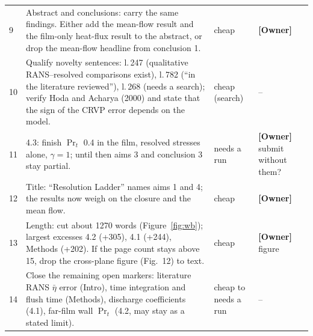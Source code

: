 \documentclass[10pt]{article}
\begin{document}
{\begin{longtable}{@{}L{0.4cm} L{10.6cm} L{2.4cm} L{2.4cm}@{}}
9 & Abstract and conclusions: carry the same findings. Either add the mean-flow result and the film-only
heat-flux result to the abstract, or drop the mean-flow headline from conclusion 1. & cheap & \textbf{[Owner]} \\
10 & Qualify novelty sentences: l.\,247 (qualitative RANS--resolved comparisons exist), l.\,782 (``in the
literature reviewed''), l.\,268 (needs a search); verify Hoda and Acharya (2000) and state that the sign of the
CRVP error depends on the model. & cheap (search) & -- \\
11 & 4.3: finish $\Pr_t$ 0.4 in the film, resolved stresses alone, $\gamma=1$; until then aims 3 and conclusion 3
stay partial. & needs a run & \textbf{[Owner]} submit without them? \\
12 & Title: ``Resolution Ladder'' names aims 1 and 4; the results now weigh on the closure and the mean flow. &
cheap & \textbf{[Owner]} \\
13 & Length: cut about 1270 words (Figure~\ref{fig:wb}); largest excesses 4.2 (+305), 4.1 (+244), Methods (+202).
If the page count stays above 15, drop the cross-plane figure (Fig.~12) to text. & cheap &
\textbf{[Owner]} figure \\
14 & Close the remaining open markers: literature RANS $\bar\eta$ error (Intro), time integration and flush time
(Methods), discharge coefficients (4.1), far-film wall $\Pr_t$ (4.2, may stay as a stated limit). & cheap to
needs a run & -- \\
\bottomrule
\end{longtable}}
\end{document}
